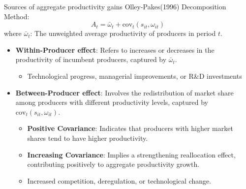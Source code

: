 \documentclass[aspectratio=169]{beamer}  %
\begin{document}
\begin{frame}{Sources of aggregate productivity gains}
    Olley-Pakes(1996) Decomposition Method:
    \[
    A_t = \bar{\omega}_t + \text{cov}_t(s_{it}, \omega_{it})
    \]
    where \( \bar{\omega}_t \): The unweighted average productivity of producers in period \( t \).
    \begin{itemize}
        \item \textbf{Within-Producer effect}: Refers to increases or decreases in the productivity of incumbent producers, captured by \( \bar{\omega}_t \).
        \begin{itemize}
            \item Technological progress, managerial improvements, or R\&D investments
        \end{itemize}
        \item \textbf{Between-Producer effect}: Involves the redistribution of market share among producers with different productivity levels, captured by \(\text{cov}_t(s_{it}, \omega_{it})\).
        \begin{itemize}
            \item \textbf{Positive Covariance}: Indicates that producers with higher market shares tend to have higher productivity.
            \item \textbf{Increasing Covariance}: Implies a strengthening reallocation effect, contributing positively to aggregate productivity growth.
            \item Increased competition, deregulation, or technological change.
        \end{itemize}
    \end{itemize}
\end{frame}
\end{document}
